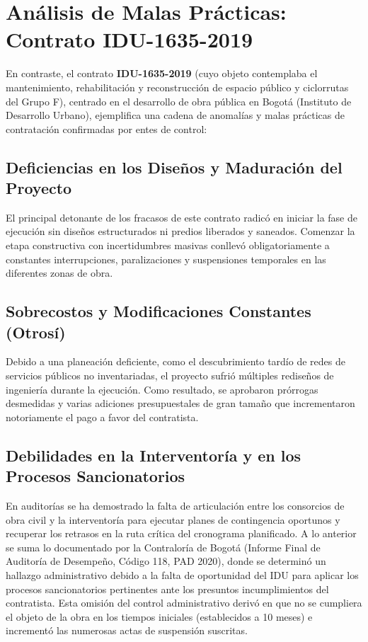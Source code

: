 \documentclass[9pt,a4paper,oneside]{rho-class/rho}
\begin{document}
\section{Análisis de Malas Prácticas: Contrato IDU-1635-2019}

    En contraste, el contrato \textbf{IDU-1635-2019} (cuyo objeto contemplaba el mantenimiento, rehabilitación y reconstrucción de espacio público y ciclorrutas del Grupo F), centrado en el desarrollo de obra pública en Bogotá (Instituto de Desarrollo Urbano), ejemplifica una cadena de anomalías y malas prácticas de contratación confirmadas por entes de control:

    \subsection{Deficiencias en los Diseños y Maduración del Proyecto}
    El principal detonante de los fracasos de este contrato radicó en iniciar la fase de ejecución sin diseños estructurados ni predios liberados y saneados. Comenzar la etapa constructiva con incertidumbres masivas conllevó obligatoriamente a constantes interrupciones, paralizaciones y suspensiones temporales en las diferentes zonas de obra.

    \subsection{Sobrecostos y Modificaciones Constantes (Otrosí)}
    Debido a una planeación deficiente, como el descubrimiento tardío de redes de servicios públicos no inventariadas, el proyecto sufrió múltiples rediseños de ingeniería durante la ejecución. Como resultado, se aprobaron prórrogas desmedidas y varias adiciones presupuestales de gran tamaño que incrementaron notoriamente el pago a favor del contratista.

    \subsection{Debilidades en la Interventoría y en los Procesos Sancionatorios}
    En auditorías se ha demostrado la falta de articulación entre los consorcios de obra civil y la interventoría para ejecutar planes de contingencia oportunos y recuperar los retrasos en la ruta crítica del cronograma planificado. A lo anterior se suma lo documentado por la Contraloría de Bogotá (Informe Final de Auditoría de Desempeño, Código 118, PAD 2020), donde se determinó un hallazgo administrativo debido a la falta de oportunidad del IDU para aplicar los procesos sancionatorios pertinentes ante los presuntos incumplimientos del contratista. Esta omisión del control administrativo derivó en que no se cumpliera el objeto de la obra en los tiempos iniciales (establecidos a 10 meses) e incrementó las numerosas actas de suspensión suscritas.
\end{document}
